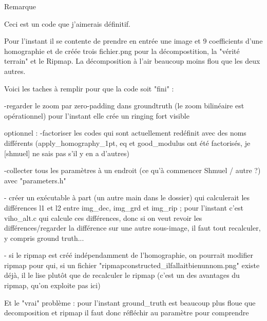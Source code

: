 Remarque

Ceci est un code que j’aimerais définitif.

Pour l'instant il se contente de prendre en entrée une image et 9 coefficients d'une homographie et de créée trois fichier.png pour la décompostition, la "vérité terrain" et le Ripmap.
La décomposition à l'air beaucoup moins flou que les deux autres.



Voici les taches à remplir pour que la code soit "fini" :

	-regarder le zoom par zero-padding dans groundtruth (le zoom bilinéaire est opérationnel)
		pour l'instant elle crée un ringing fort visible
	
	
	
optionnel :
	-factoriser les codes qui sont actuellement redéfinit avec des noms différents (apply_homography_1pt, eq et good_modulus ont été factorisés, je [shmuel] ne sais pas s'il y en a d'autres) 
	
	-collecter tous les paramètres à un endroit (ce qu'à commencer Shmuel / autre ?) avec "parameters.h"
	
	- créer un exécutable à part (un autre main dans le dossier) qui calculerait les différences l1 et l2 entre img_dec, img_grd et img_rip ; pour l'instant c'est viho_alt.c qui calcule ces différences, donc si on veut revoir les différences/regarder la différence sur une autre sous-image, il faut tout recalculer, y compris ground truth...
	
	- si le ripmap est créé indépendamment de l'homographie, on pourrait modifier ripmap pour qui, si un fichier "ripmapconstructed_ilfallaitbienunnom.png" existe déjà, il le lise plutôt que de recalculer le ripmap (c'est un des avantages du ripmap, qu'on exploite pas ici)
	
	
	
Et le "vrai" problème :
	pour l'instant ground_truth est beaucoup plus floue que decomposition et ripmap
	il faut donc réfléchir au paramètre pour comprendre
